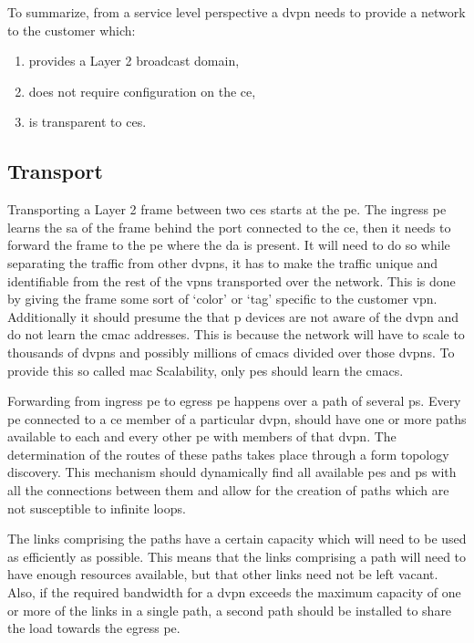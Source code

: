 To summarize, from a service level perspective a \ac{dvpn} needs to provide a network to the customer which:

\begin{enumerate}
	\item provides a Layer 2 broadcast domain,
	\item does not require configuration on the \ac{ce},
	\item is transparent to \acp{ce}.
\end{enumerate}


\subsection{Transport} %
\label{sub:transport}

Transporting a Layer 2 frame between two \acp{ce} starts at the \ac{pe}. The ingress \ac{pe} learns the \ac{sa} of the frame behind the port connected to the \ac{ce}, then it needs to forward the frame to the \ac{pe} where the \ac{da} is present. It will need to do so while separating the traffic from other \acp{dvpn}, it has to make the traffic unique and identifiable from the rest of the \acp{vpn} transported over the network. This is done by giving the frame some sort of `color' or `tag' specific to the customer \ac{vpn}. Additionally it should presume the that \ac{p} devices are not aware of the \ac{dvpn} and do not learn the \ac{cmac} addresses. This is because the network will have to scale to thousands of \acp{dvpn} and possibly millions of \acp{cmac} divided over those \acp{dvpn}. To provide this so called \acs{mac} Scalability, only \acp{pe} should learn the \acp{cmac}.

Forwarding from ingress \ac{pe} to egress \ac{pe} happens over a path of several \acp{p}. Every \ac{pe} connected to a \ac{ce} member of a particular \ac{dvpn}, should have one or more paths available to each and every other \ac{pe} with members of that \ac{dvpn}. The determination of the routes of these paths takes place through a form topology discovery. This mechanism should dynamically find all available \acp{pe} and \acp{p} with all the connections between them and allow for the creation of paths which are not susceptible to infinite loops.

The links comprising the paths have a certain capacity which will need to be used as efficiently as possible. This means that the links comprising a path will need to have enough resources available, but that other links need not be left vacant. Also, if the required bandwidth for a \ac{dvpn} exceeds the maximum capacity of one or more of the links in a single path, a second path should be installed to share the load towards the egress \ac{pe}. 

